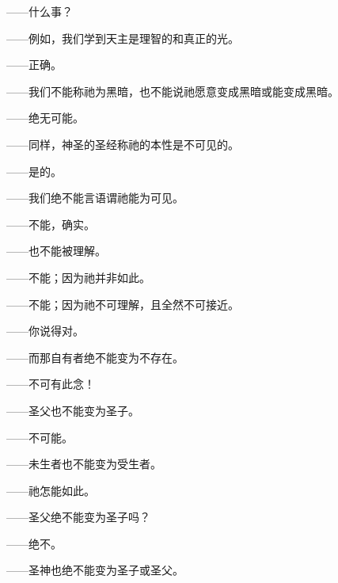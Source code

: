 ——什么事？\par

——例如，我们学到天主是理智的和真正的光。\par

——正确。\par

——我们不能称祂为黑暗，也不能说祂愿意变成黑暗或能变成黑暗。\par

——绝无可能。\par

——同样，神圣的圣经称祂的本性是不可见的。\par

——是的。\par

——我们绝不能言语谓祂能为可见。\par

——不能，确实。\par

——也不能被理解。\par

——不能；因为祂并非如此。\par

——不能；因为祂不可理解，且全然不可接近。\par

——你说得对。\par

——而那自有者绝不能变为不存在。\par

——不可有此念！\par

——圣父也不能变为圣子。\par

——不可能。\par

——未生者也不能变为受生者。\par

——祂怎能如此。\par

——圣父绝不能变为圣子吗？\par

——绝不。\par

——圣神也绝不能变为圣子或圣父。\par


